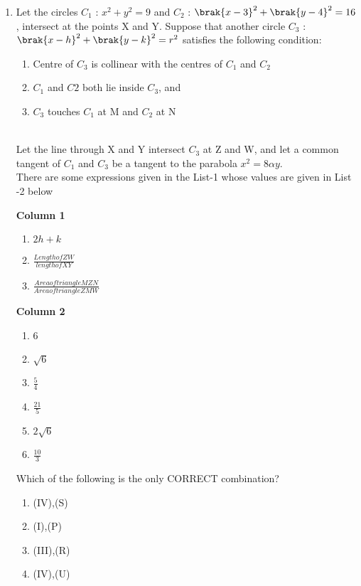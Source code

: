 \documentclass[journal,12pt,twocolumn]{IEEEtran}
\theoremstyle{remark}
\begin{document}
\begin{enumerate}
\item Let the circles $C_{1}$ : $x^2+y^2=9$ and $C_{2}$ : $\brak{x-3}^2+\brak{y-4}^2 = 16$, intersect at the points X and Y. Suppose that another circle $C_{3}$ : $\brak{x-h}^2+\brak{y-k}^2=r^2$ satisfies the following condition:\\
 
 
 \begin{enumerate}[label=(\roman*)]
 \item Centre of $C_{3}$ is collinear with the centres of $C_{1}$ and $C_{2}$
 \item $C_{1}$ and $C{2}$ both lie inside $C_{3}$, and

 \item $C_{3}$ touches $C_{1}$ at M and $C_{2}$ at N
\end{enumerate}\\
Let the line through X and Y intersect $C_{3}$ at Z and W, and let a common tangent of $C_{1}$ and $C_{3}$ be a tangent to the parabola $x^2=8\alpha y.$\\

There are some expressions given in the List-1 whose values are given in List -2 below
\begin{multicols}	

\textbf{Column 1}
\begin{enumerate}[label=(\Alph*)]           
\item $2h+k$                                  
\item $\frac{Length of ZW}{length of XY}$     
\item $\frac{Area of triangle MZN}{Area of triangle ZMW}$                     \end{enumerate}                              
\columnbreak
 \textbf{Column 2}
 \begin{enumerate}[label=(\alph*) , start=16]
 \item 6
 \item $\sqrt{6}$
 \item $\frac{5}{4}$                           
 \item $\frac{21}{5}$                          
 \item $2\sqrt{6}$                             
 \item $\frac{10}{3}$                         
 \end{enumerate}
 \end{multicols}
 Which of the following is the only CORRECT combination?                                    
\begin{enumerate}[label=(\alph*)]            
 \item (IV),(S)
 \item (I),(P)
 \item (III),(R)    
 \item (IV),(U)
 \end{enumerate}



\end{enumerate}
\end{document}
